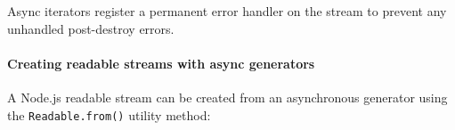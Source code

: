Async iterators register a permanent error handler on the stream to
prevent any unhandled post-destroy errors.

\paragraph{Creating readable streams with async
generators}\label{creating-readable-streams-with-async-generators}

A Node.js readable stream can be created from an asynchronous generator
using the \texttt{Readable.from()} utility method:

\begin{Shaded}
\begin{Highlighting}[]
\OperatorTok{=} \NormalTok{(}\NormalTok{)}\OperatorTok{;}

\OperatorTok{=}  \NormalTok{()}\OperatorTok{;}
\OperatorTok{=}\OperatorTok{;}

  \OperatorTok{*} \NormalTok{() \{}
   \OperatorTok{;}
   \OperatorTok{;}
   \OperatorTok{;}
   \OperatorTok{;}
\NormalTok{\}}

\OperatorTok{=}\NormalTok{(}\NormalTok{())}\OperatorTok{;}
\NormalTok{(}\OperatorTok{,}\NormalTok{ () }\KeywordTok{=\textgreater{}}\NormalTok{ \{}
\NormalTok{()}\OperatorTok{;}
\NormalTok{\})}\OperatorTok{;}

\NormalTok{(}\OperatorTok{,}\KeywordTok{=\textgreater{}}\NormalTok{ \{}
  \OperatorTok{;}
\NormalTok{\})}\OperatorTok{;}
\end{Highlighting}
\end{Shaded}

